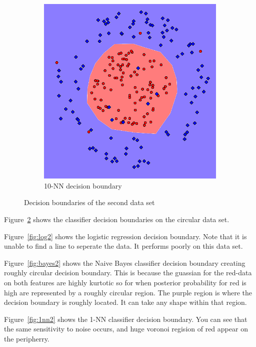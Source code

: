 \documentclass[letterpaper,10pt]{article} %
\begin{document}
\begin{figure}[h]
\begin{subfigure}[b]{\textwidth}
\includegraphics[width=\textwidth]{handout/q3-2-10NN}
\caption{10-NN decision boundary}
\label{fig:10nn2}
\end{subfigure}

\caption{Decision boundaries of the second data set}\label{fig:decision2}
\end{figure}

Figure~\ref{fig:decision2} shows the classifier decision boundaries on the circular data set.

Figure~\ref{fig:log2} shows the logistic regression decision boundary. Note that it is unable to find a line to seperate the data. It performs poorly on this data set.

Figure~\ref{fig:bayes2} shows the Naive Bayes classifier decision boundary creating roughly circular decision boundary. This is because the guassian for the red-data on both features are highly kurtotic so for when posterior probability for red is high are represented by a roughly circular region. The purple region is where the decision boundary is roughly located. It can take any shape within that region.

Figure~\ref{fig:1nn2} shows the 1-NN classifier decision boundary. You can see that the same sensitivity to noise occurs, and huge voronoi regision of red appear on the peripherry.
\end{document}
